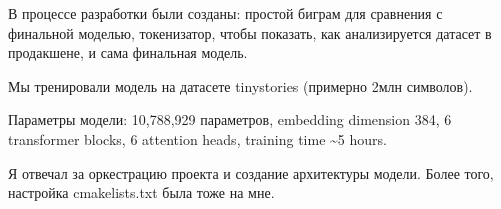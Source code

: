 \begin{cventries}
{\begin{cvitems}
      \item {В процессе разработки были созданы: простой биграм для сравнения с финальной моделью, токенизатор, чтобы показать, как анализируется датасет в продакшене, и сама финальная модель.}
      \item {Мы тренировали модель на датасете tinystories (примерно 2млн символов).}
      \item {Параметры модели: 10,788,929 параметров, embedding dimension 384, 6 transformer blocks, 6 attention heads, training time \textasciitilde{}5 hours.}
      \item {Я отвечал за оркестрацию проекта и создание архитектуры модели. Более того, настройка cmakelists.txt была тоже на мне.}
    \end{cvitems}
  }




    


\end{cventries}
